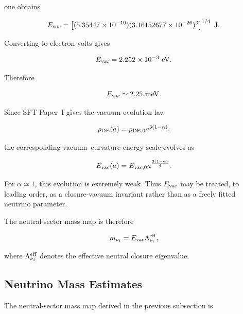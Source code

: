\documentclass[11pt]{article}
\theoremstyle{definition}
\theoremstyle{remark}
\begin{document}
one obtains

\begin{equation}
E_{\rm vac}
=
\left[
(5.35447\times10^{-10})
(3.16152677\times10^{-26})^3
\right]^{1/4}
\ {\rm J}.
\end{equation}

Converting to electron volts gives

\begin{equation}
E_{\rm vac}
=
2.252\times10^{-3}\ {\rm eV}.
\end{equation}

Therefore

\begin{equation}
E_{\rm vac}
\simeq
2.25\ {\rm meV}.
\label{eq:Evac_numerical}
\end{equation}

Since SFT Paper~I gives the vacuum evolution law

\begin{equation}
\rho_{\rm DE}(a)
=
\rho_{{\rm DE},0}
a^{3(1-\alpha)},
\end{equation}

the corresponding vacuum--curvature energy scale evolves as

\begin{equation}
E_{\rm vac}(a)
=
E_{{\rm vac},0}
a^{\frac{3(1-\alpha)}{4}}.
\end{equation}

For \(\alpha\simeq1\), this evolution is extremely weak.
Thus \(E_{\rm vac}\) may be treated, to leading order, as a
closure-vacuum invariant rather than as a freely fitted neutrino
parameter.

The neutral-sector mass map is therefore

\begin{equation}
m_{\nu_i}
=
E_{\rm vac}
\Lambda_{\nu_i}^{\rm eff},
\label{eq:neutrino_mass_map}
\end{equation}

where \(\Lambda_{\nu_i}^{\rm eff}\) denotes the effective
neutral closure eigenvalue.


\subsection{Neutrino Mass Estimates}
\label{subsec:neutrino_mass_estimates}

The neutral-sector mass map derived in the previous subsection is
\end{document}
